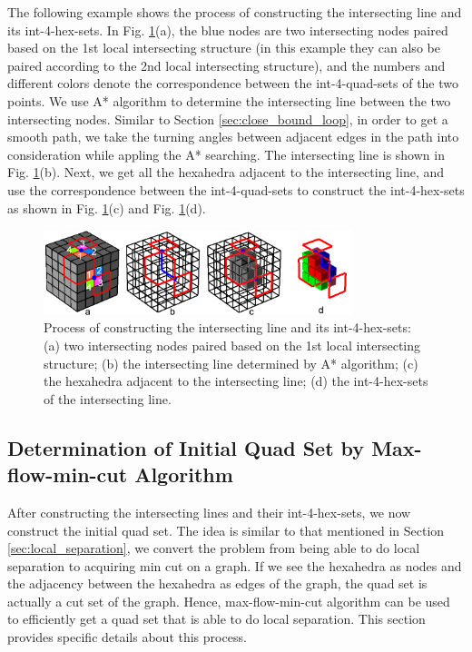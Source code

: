 \documentclass[final,5p,times,twocolumn]{elsarticle}
\begin{document}
The following example shows the process of constructing the intersecting line and its int-4-hex-sets. In Fig. \ref{fig:det_int_line}(a), the blue nodes are two intersecting nodes paired based on the 1st local intersecting structure (in this example they can also be paired according to the 2nd local intersecting structure), and the numbers and different colors denote the correspondence between the int-4-quad-sets of the two points. We use A* algorithm to determine the intersecting line between the two intersecting nodes. Similar to Section \ref{sec:close_bound_loop}, in order to get a smooth path, we take the turning angles between adjacent edges in the path into consideration while appling the A* searching. The intersecting line is shown in Fig. \ref{fig:det_int_line}(b). Next, we get all the hexahedra adjacent to the intersecting line, and use the correspondence between the int-4-quad-sets to construct the int-4-hex-sets as shown in Fig. \ref{fig:det_int_line}(c) and Fig. \ref{fig:det_int_line}(d).

\begin{figure}[htbp]
\begin{center}
\includegraphics[width=9cm]{det_int_line.png}
\caption{Process of constructing the intersecting line and its int-4-hex-sets: (a) two intersecting nodes paired based on the 1st local intersecting structure; (b) the intersecting line determined by A* algorithm; (c) the hexahedra adjacent to the intersecting line; (d) the int-4-hex-sets of the intersecting line.}
\label{fig:det_int_line}
\end{center}
\end{figure}

\subsection{Determination of Initial Quad Set by Max-flow-min-cut Algorithm}
\label{sec:det_init_quad_set}
After constructing the intersecting lines and their int-4-hex-sets, we now construct the initial quad set. The idea is similar to that mentioned in Section \ref{sec:local_separation}, we convert the problem from being able to do local separation to acquiring min cut on a graph. If we see the hexahedra as nodes and the adjacency between the hexahedra as edges of the graph, the quad set is actually a cut set of the graph. Hence, max-flow-min-cut algorithm can be used to efficiently get a quad set that is able to do local separation. This section provides specific details about this process.
\end{document}

